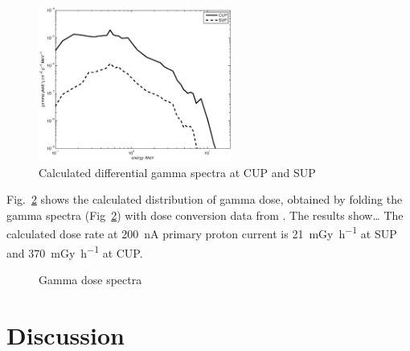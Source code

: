 \documentclass[11pt,a4paper]{IEEEtran}
\let\MYoriglatexcaption\caption
\renewcommand{\caption}[2][\relax]{\MYoriglatexcaption[#2]{#2}}
\begin{document}
\begin{figure}[t]
    \centering
    \includegraphics[width=2.5in]{gDYieldcomparedRADECS.eps}
    \caption{Calculated differential gamma spectra at CUP and SUP}
    \label{fig:DifferentialGammaSpectra}
\end{figure}

Fig.~\ref{fig:GammaDoseEnergy} shows the calculated distribution of gamma dose, obtained by folding the gamma spectra (Fig~\ref{fig:GammaDoseEnergy}) with dose conversion data from \cite{tbd}.
The results show\ldots{}
The calculated dose rate at \SI{200}{\nA} primary proton current is \SI{21}{\milli\gray\per\hour} at SUP and \SI{370}{\milli\gray\per\hour} at CUP.

\begin{figure}[t]
    \begin{minipage}{\columnwidth}
        \label{fig:GammaDoseEnergySUP}
    \end{minipage}
    \begin{minipage}{\columnwidth}
        \label{fig:GammaDoseEnergyCUP}
    \end{minipage}
    \caption{Gamma dose spectra}
    \label{fig:GammaDoseEnergy}
\end{figure}

\section{Discussion}

\end{document}
